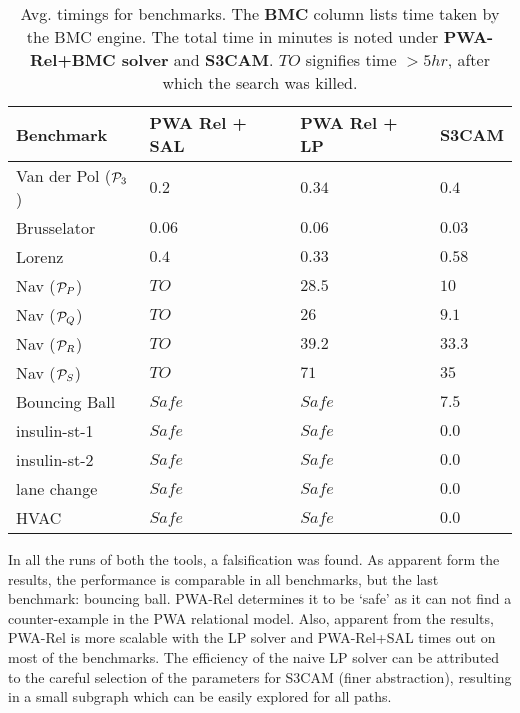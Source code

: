 \begin{table}[!htbp]
\centering
\caption{Avg. timings for benchmarks. The \textbf{BMC} column lists
time taken by the BMC engine. The total time in minutes is noted under
    \textbf{PWA-Rel+BMC solver} and \textbf{S3CAM}.
$TO$ signifies time $>5hr$, after which the search was killed.}
\label{tab:res-rel}
\begin{tabular}{@{}llll@{}}
\toprule
    Benchmark & PWA Rel + SAL & PWA Rel + LP & S3CAM\\
\midrule
    Van der Pol ($\mathcal{P}_3$)   &$0.2$ & $0.34$ & $0.4$\\
    Brusselator               &$0.06$ & $0.06$ & $0.03$\\
    Lorenz                    &$0.4$ & $0.33$ & $0.58$\\
    Nav ($\mathcal{P}_P$)           &$TO$ & $28.5$  & $10$ \\%
    Nav ($\mathcal{P}_Q$)           &$TO$ & $26$   & $9.1$ \\%
    Nav ($\mathcal{P}_R$)           &$TO$ & $39.2$  & $33.3$\\
    Nav ($\mathcal{P}_S$)           &$TO$ & $71$  & $35$\\
    Bouncing Ball             &$Safe$ & $Safe$  & $7.5$\\

    insulin-st-1             &$Safe$ & $Safe$  & $0.0$\\
    insulin-st-2             &$Safe$ & $Safe$  & $0.0$\\
    lane change              &$Safe$ & $Safe$  & $0.0$\\
    HVAC                     &$Safe$ & $Safe$  & $0.0$\\

\bottomrule
\end{tabular}
\end{table}


In all the runs of both the tools, a falsification was found. As
apparent form the results, the performance is comparable in all
benchmarks, but the last benchmark: bouncing ball. PWA-Rel determines
it to be `safe' as it can not find a counter-example in the PWA
relational model. Also, apparent from the results, PWA-Rel is more
scalable with the LP solver and PWA-Rel+SAL times out on most of the
benchmarks.  The efficiency of the naive LP solver can be attributed
to the careful selection of the parameters for S3CAM (finer
abstraction), resulting in a small subgraph which can be easily
explored for all paths.

